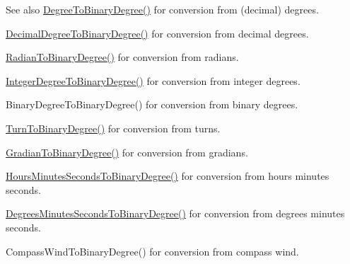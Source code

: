 \begin{DoxySeeAlso}{See also}
\mbox{\hyperlink{group___e_g_x_math-_angle_conversions-_degree_gacd1e3dc5194e89426a899a7cac4874f8}{Degree\+To\+Binary\+Degree()}} for conversion from (decimal) degrees. 

\mbox{\hyperlink{group___e_g_x_math-_angle_conversions-_decimal_degree_gaceec7ae7988c7f342d0b0fa6940720a1}{Decimal\+Degree\+To\+Binary\+Degree()}} for conversion from decimal degrees. 

\mbox{\hyperlink{group___e_g_x_math-_angle_conversions-_radian_ga13311d9b6977d514f1d6c336e7c0162b}{Radian\+To\+Binary\+Degree()}} for conversion from radians. 

\mbox{\hyperlink{group___e_g_x_math-_angle_conversions-_integer_degree_ga694bbfe624c3c14e97ce6155ca9bc44d}{Integer\+Degree\+To\+Binary\+Degree()}} for conversion from integer degrees. 

Binary\+Degree\+To\+Binary\+Degree() for conversion from binary degrees. 

\mbox{\hyperlink{group___e_g_x_math-_angle_conversions-_turn_ga678efb8f5c3958351fc3f1dfaf117b28}{Turn\+To\+Binary\+Degree()}} for conversion from turns. 

\mbox{\hyperlink{group___e_g_x_math-_angle_conversions-_gradian_ga6bf31920148bfd61f1f06eb961c3f62b}{Gradian\+To\+Binary\+Degree()}} for conversion from gradians. 

\mbox{\hyperlink{group___e_g_x_math-_angle_conversions-_hours_minutes_seconds_ga962a367fd21f0047eb0a7116a59c2bfc}{Hours\+Minutes\+Seconds\+To\+Binary\+Degree()}} for conversion from hours minutes seconds. 

\mbox{\hyperlink{group___e_g_x_math-_angle_conversions-_degrees_minutes_seconds_ga838c47916ce872cab2dfecd5ccf0a6ee}{Degrees\+Minutes\+Seconds\+To\+Binary\+Degree()}} for conversion from degrees minutes seconds. 

Compass\+Wind\+To\+Binary\+Degree() for conversion from compass wind. 
\end{DoxySeeAlso}
\mbox{\label{group___e_g_x_math-_angle_conversions-_d_m_s_ga3beb450aec060ec6d4f0abae7eb7e503}} 
